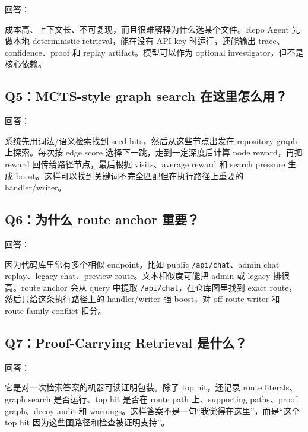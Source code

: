 \documentclass[UTF8,12pt,openany]{ctexbook}
\begin{document}
回答：\par

成本高、上下文长、不可复现，而且很难解释为什么选某个文件。Repo Agent 先做本地 deterministic retrieval，能在没有 API key 时运行，还能输出 trace、confidence、proof 和 replay artifact。模型可以作为 optional investigator，但不是核心依赖。\par

\subsection{Q5：MCTS-style graph search 在这里怎么用？}

回答：\par

系统先用词法/语义检索找到 seed hits，然后从这些节点出发在 repository graph 上探索。每次按 edge score 选择下一跳，走到一定深度后计算 node reward，再把 reward 回传给路径节点，最后根据 visits、average reward 和 search pressure 生成 boost。这样可以找到关键词不完全匹配但在执行路径上重要的 handler/writer。\par

\subsection{Q6：为什么 route anchor 重要？}

回答：\par

因为代码库里常有多个相似 endpoint，比如 public \texttt{/api/chat}、admin chat replay、legacy chat、preview route。文本相似度可能把 admin 或 legacy 排很高。route anchor 会从 query 中提取 \texttt{/api/chat}，在仓库图里找到 exact route，然后只给这条执行路径上的 handler/writer 强 boost，对 off-route writer 和 route-family conflict 扣分。\par

\subsection{Q7：Proof-Carrying Retrieval 是什么？}

回答：\par

它是对一次检索答案的机器可读证明包装。除了 top hit，还记录 route literals、graph search 是否运行、top hit 是否在 route path 上、supporting paths、proof graph、decoy audit 和 warnings。这样答案不是一句“我觉得在这里”，而是“这个 top hit 因为这些图路径和检查被证明支持”。\par
\end{document}
